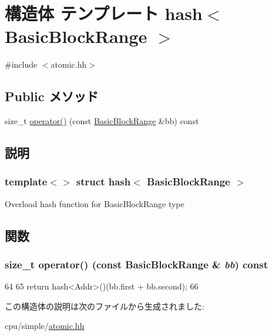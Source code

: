 \hypertarget{structhash_3_01BasicBlockRange_01_4}{
\section{構造体 テンプレート hash$<$ BasicBlockRange $>$}
\label{structhash_3_01BasicBlockRange_01_4}
}


{\ttfamily \#include $<$atomic.hh$>$}\subsection*{Public メソッド}
\begin{DoxyCompactItemize}
\item 
size\_\-t \hyperlink{structhash_3_01BasicBlockRange_01_4_a4ff2491210b665732234a829a7d26f3c}{operator()} (const \hyperlink{classstd_1_1pair}{BasicBlockRange} \&bb) const 
\end{DoxyCompactItemize}


\subsection{説明}
\subsubsection*{template$<$$>$ struct hash$<$ BasicBlockRange $>$}

Overload hash function for BasicBlockRange type 

\subsection{関数}
\hypertarget{structhash_3_01BasicBlockRange_01_4_a4ff2491210b665732234a829a7d26f3c}{
\subsubsection[{operator()}]{\setlength{\rightskip}{0pt plus 5cm}size\_\-t operator() (const {\bf BasicBlockRange} \& {\em bb}) const}}
\label{structhash_3_01BasicBlockRange_01_4_a4ff2491210b665732234a829a7d26f3c}



\begin{DoxyCode}
64                                                        {
65         return hash<Addr>()(bb.first + bb.second);
66     }
\end{DoxyCode}


この構造体の説明は次のファイルから生成されました:\begin{DoxyCompactItemize}
\item 
cpu/simple/\hyperlink{atomic_8hh}{atomic.hh}\end{DoxyCompactItemize}
